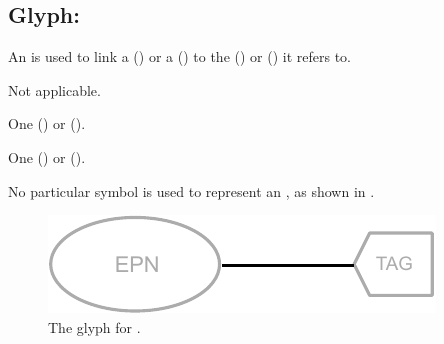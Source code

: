 \subsection{Glyph:  }\label{sec:equivalenceArc}

An  is used to link a  () or a  () to the  () or  () it refers to.


\begin{glyphDescription}

\glyphSboTerm
Not applicable.

\glyphOrigin
One  () or  ().

\glyphTarget
One  () or  ().

\glyphSymbol No particular symbol is used to represent an , as shown in .
 \end{glyphDescription}

\begin{figure}[H]
  \centering
  \includegraphics[scale = 0.8]{images/equivalenceArc}
  \caption{The \PD glyph for .}
  \label{fig:equivalenceArc}
\end{figure}
